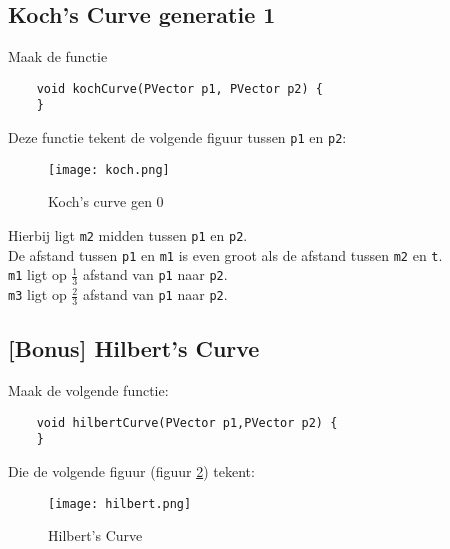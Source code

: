 \subsection{Koch's Curve generatie 1}
Maak de functie
\begin{lstlisting}
	void kochCurve(PVector p1, PVector p2) {
	}
\end{lstlisting}
Deze functie tekent de volgende figuur tussen \texttt{p1} en \texttt{p2}:
\begin{figure}[h!]
	\centering
	\texttt{[image: koch.png]}
	\caption{Koch's curve gen 0}
	\label{fig:koch}
\end{figure}
Hierbij ligt \texttt{m2} midden tussen \texttt{p1} en \texttt{p2}.\\
De afstand tussen \texttt{p1} en \texttt{m1} is even groot als de afstand tussen \texttt{m2} en \texttt{t}.\\
\texttt{m1} ligt op $\frac{1}{3}$ afstand van \texttt{p1} naar \texttt{p2}.\\
\texttt{m3} ligt op $\frac{2}{3}$ afstand van \texttt{p1} naar \texttt{p2}.\\

\subsection{[Bonus] Hilbert's Curve}
Maak de volgende functie:
\begin{lstlisting}
	void hilbertCurve(PVector p1,PVector p2) {
	} 
\end{lstlisting}
Die de volgende figuur (figuur \ref{fig:koch}) tekent:
\begin{figure}[h!]
	\centering
	\texttt{[image: hilbert.png]}
	\caption{Hilbert's Curve}
	\label{fig:koch}
\end{figure}

